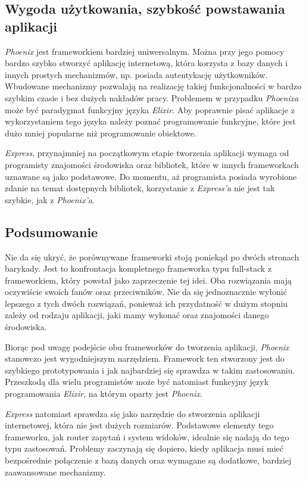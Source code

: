 \documentclass[mgr,oneside]{mgr}
\begin{document}
\subsection{Wygoda użytkowania, szybkość powstawania aplikacji}
\emph{Phoenix} jest frameworkiem bardziej uniwersalnym. Można przy jego pomocy bardzo szybko stworzyć aplikację internetową, która korzysta z bazy danych i innych prostych mechanizmów, np. posiada autentykację użytkowników. Wbudowane mechanizmy pozwalają na realizację takiej funkcjonalności w bardzo szybkim czasie i bez dużych nakładów pracy. Problemem w przypadku \emph{Phoenixa} może być paradygmat funkcyjny języka \emph{Elixir}. Aby poprawnie pisać aplikacje z wykorzystaniem tego języka należy poznać programowanie funkcyjne, które jest dużo mniej popularne niż programowanie obiektowe.

\emph{Express}, przynajmniej na początkowym etapie tworzenia aplikacji wymaga od programisty znajomości środowiska oraz bibliotek, które w innych frameworkach uznawane są jako podstawowe. Do momentu, aż programista posiada wyrobione zdanie na temat dostępnych bibliotek, korzystanie z \emph{Express'a} nie jest tak szybkie, jak z \emph{Phoenix'a}.

\subsection{Podsumowanie}
Nie da się ukryć, że porównywane frameworki stoją poniekąd po dwóch stronach barykady. Jest to konfrontacja kompletnego frameworka typu full-stack z frameworkiem, który powstał jako zaprzeczenie tej idei. Oba rozwiązania mają oczywiście swoich fanów oraz przeciwników. Nie da się jednoznacznie wyłonić lepszego z tych dwóch rozwiązań, ponieważ ich przydatność w dużym stopniu zależy od rodzaju aplikacji, jaki mamy wykonać oraz znajomości danego środowiska.

Biorąc pod uwagę podejście obu frameworków do tworzenia aplikacji, \emph{Phoenix} stanowczo jest wygodniejszym narzędziem. Framework ten stworzony jest do szybkiego prototypowania i jak najbardziej się sprawdza w takim zastosowaniu. Przeszkodą dla wielu programistów może być natomiast funkcyjny język programowania \emph{Elixir}, na którym oparty jest \emph{Phoenix}.

\emph{Express} natomiast sprawdza się jako narzędzie do stworzenia aplikacji internetowej, która nie jest dużych rozmiarów. Podstawowe elementy tego frameworku, jak router zapytań i system widoków, idealnie się nadają do tego typu zastosowań. Problemy zaczynają się dopiero, kiedy aplikacja musi mieć bezpośrednie połączenie z bazą danych oraz wymagane są dodatkowe, bardziej zaawansowane mechanizmy.
\end{document}
